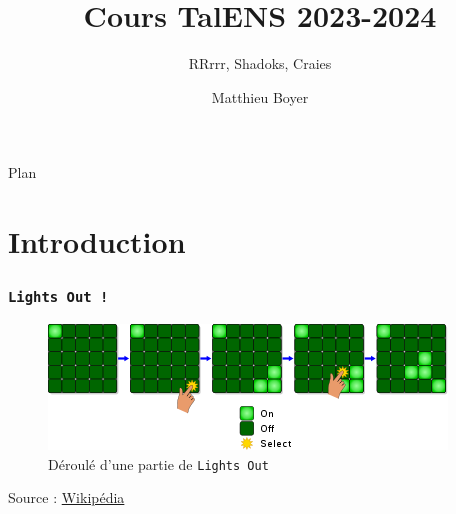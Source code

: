 \documentclass{beamercours}
\title{Cours TalENS 2023-2024}
\subtitle{RRrrr, Shadoks, Craies}
\author{Matthieu Boyer}
\begin{document}
\maketitle
\begin{frame}{Plan}\tableofcontents[sectionstyle=show]
\end{frame}
\section*{Introduction}
\begin{frame}
    \frametitle{\tt Lights Out !}
    \begin{figure}
        \includegraphics[scale = .5]{Fichiers/lights-out.png}
        \caption{Déroulé d'une partie de \texttt{Lights Out}}
    \end{figure}
    Source : \href{https://upload.wikimedia.org/wikipedia/commons/thumb/a/a9/LightsOutIllustration.svg/400px-LightsOutIllustration.svg.png}{Wikipédia}\\

\end{frame}
\end{document}
